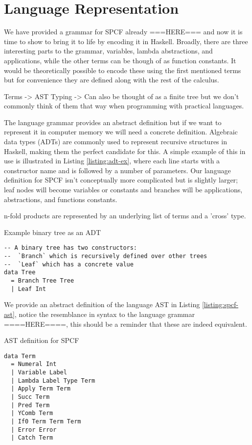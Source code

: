 \documentclass[12pt,a4paper]{report}
\theoremstyle{definition}
\theoremstyle{remark}
\begin{document}
\section{Language Representation}

We have provided a grammar for SPCF already ===HERE=== and now it is time to show to bring it to life by encoding it in Haskell. Broadly, there are three interesting parts to the grammar, variables, lambda abstractions, and applications, while the other terms can be though of as function constants. It would be theoretically possible to encode these using the first mentioned terms but for convenience they are defined along with the rest of the calculus. 

Terms -> AST
Typing -> Can also be thought of as a finite tree but we don't commonly think of them that way when programming with practical languages.

The language grammar provides an abstract definition but if we want to represent it in computer memory we will need a concrete definition. Algebraic data types (ADTs) are commonly used to represent recursive structures in Haskell, making them the perfect candidate for this. A simple example of this in use is illustrated in Listing \ref{listing:adt-ex}, where each line starts with a constructor name and is followed by a number of parameters. Our language definition for SPCF isn't conceptually more complicated but is slightly larger; leaf nodes will become variables or constants and branches will be applications, abstractions, and functions constants. 

n-fold products are represented by an underlying list of terms and a 'cross' type.

\begin{listing}[!ht]
\caption{Example binary tree as an ADT}
\begin{verbatim}
-- A binary tree has two constructors:
--  `Branch` which is recursively defined over other trees
--  `Leaf` which has a concrete value
data Tree
  = Branch Tree Tree 
  | Leaf Int
\end{verbatim}
\label{listing:adt-ex}
\end{listing}

We provide an abstract definition of the language AST in Listing \ref{listing:spcf-ast}, notice the resemblance in syntax to the language grammar ====HERE====, this should be a reminder that these are indeed equivalent.

\begin{listing}[!ht]
\caption{AST definition for SPCF}
\begin{verbatim}
data Term
  = Numeral Int
  | Variable Label
  | Lambda Label Type Term
  | Apply Term Term 
  | Succ Term
  | Pred Term
  | YComb Term
  | If0 Term Term Term
  | Error Error
  | Catch Term
\end{verbatim}
\label{listing:spcf-ast}
\end{listing}
\end{document}
